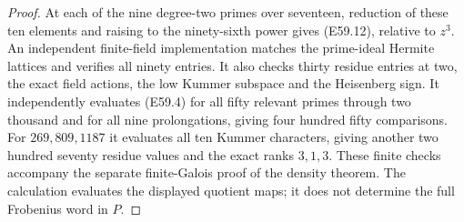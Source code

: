 \begin{proof}
At each of the nine degree-two primes
over seventeen, reduction of these ten
elements and raising to the ninety-sixth
power gives (E59.12), relative to $z^3$.
An independent finite-field implementation
matches the prime-ideal Hermite lattices
and verifies all ninety entries. It also
checks thirty residue entries at two,
the exact field actions, the low
Kummer subspace and the Heisenberg sign.
It independently evaluates (E59.4) for
all fifty relevant primes through two
thousand and for all nine prolongations,
giving four hundred fifty comparisons.
For $269,809,1187$ it evaluates all
ten Kummer characters, giving another
two hundred seventy residue values and
the exact ranks $3,1,3$.
These finite checks accompany the
separate finite-Galois proof of the
density theorem. The calculation
evaluates the displayed quotient maps;
it does not determine the full
Frobenius word in $P$.
\end{proof}
